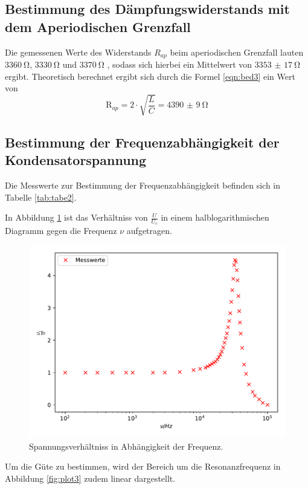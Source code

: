 \subsection{Bestimmung des Dämpfungswiderstands mit dem Aperiodischen Grenzfall}

Die gemessenen Werte des Widerstands $R_{ap}$ beim aperiodischen Grenzfall lauten
$\SI{3360}{\ohm}$, $\SI{3330}{\ohm}$ und $\SI{3370}{\ohm}$ , sodass sich hierbei ein Mittelwert
von $\SI{3353(17)}{\ohm}$ ergibt.
\noindent Theoretisch berechnet ergibt sich durch die Formel \ref{eqn:bed3}
ein Wert von
\begin{equation*}
  \text{R}_{ap}= 2 \cdot \sqrt{\frac{L}{C}} = \SI{4390(9)}{\ohm}
\end{equation*}


\subsection{Bestimmung der Frequenzabhängigkeit der Kondensatorspannung}

Die Messwerte zur Bestimmung der Frequenzabhängigkeit befinden sich in Tabelle \ref{tab:tabe2}.


\noindent In Abbildung \ref{fig:plot2} ist das Verhältniss von $ \frac{U}{U_c} $ in einem
halblogarithmischen Diagramm gegen die Frequenz $ \nu $ aufgetragen.

\begin{figure}[H]
  \centering
  \includegraphics{plot2.pdf}
  \caption{Spannungsverhältniss in Abhängigkeit der Frequenz.}
  \label{fig:plot2}
\end{figure}
\noindent Um die Güte zu bestimmen, wird der Bereich um die Resonanzfrequenz
in Abbildung \ref{fig:plot3}
zudem linear dargestellt.

